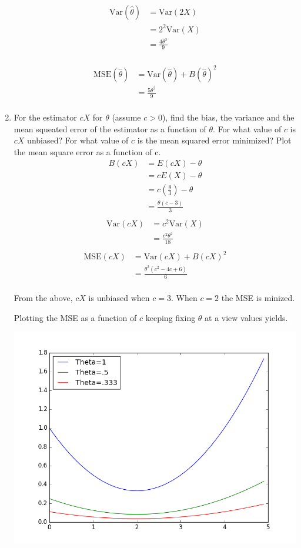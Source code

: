 \documentclass{tufte-book}
\newcommand{\Var}{\mathrm{Var}}
\newcommand{\MSE}{\mathrm{MSE}}
\theoremstyle{mytheoremstyle}
\theoremstyle{mylemstyle}
\theoremstyle{mydefstyle}
\begin{document}
\begin{enumerate}
\begin{align*}
\Var(\hat{\theta}) &= \Var(2X)\\
&= 2^2\Var(X)\\
&= \frac{4\theta^2}{9}\\
\end{align*}

\begin{align*}
\MSE(\hat{\theta}) &= \Var(\hat{\theta}) + B(\hat{\theta})^2\\
&=\frac{5\theta^2}{9}\\
\end{align*}

\item For the estimator $cX$ for $\theta$ (assume $c > 0$), find the bias, the variance and the mean squeated error of the estimator as a function of $\theta$.  For what value of $c$ is $cX$ unbiased?  For what value of $c$ is the mean squared error minimized?  Plot the mean square error as a function of c.
\begin{align*}
B(cX) &= E(cX) - \theta\\
&= cE(X) - \theta\\
&= c(\frac{\theta}{3}) - \theta\\
&= \frac{\theta(c - 3)}{3}\\
\end{align*}
\begin{align*}
\Var(cX) &= c^2\Var(X)\\
&= \frac{c^2\theta^2}{18}\\
\end{align*}
\begin{align*}
\MSE(cX) &= \Var(cX) + B(cX)^2\\
&= \frac{\theta^2(c^2 - 4c + 6)}{6}\\
\end{align*}

From the above, $cX$ is unbiased when $c=3$.  When $c=2$ the MSE is minized.

Plotting the MSE as a function of $c$ keeping fixing $\theta$ at a view values yields.

\includegraphics{q5}


\end{enumerate}
\end{document}
